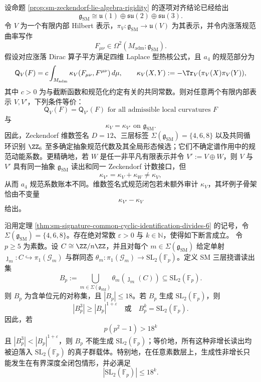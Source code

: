 \begin{proposition}[SM 签名的谱作用二次型缺口]\label{distill:connes_spectral_triples_and_chamseddine_connes_spectral_action-spectral_action_closure_family-gaugeq}
设命题 \ref{prop:sm-zeckendorf-lie-algebra-rigidity} 的逐项对齐结论已经给出
\[
\mathfrak g_{\mathrm{SM}}\cong\mathfrak u(1)\oplus\mathfrak{su}(2)\oplus\mathfrak{su}(3).
\]
令 \(V\) 为一个有限内部 Hilbert 表示，\(\pi_V:\mathfrak g_{\mathrm{SM}}\to\mathfrak u(V)\) 为其表示，并令内涨落规范曲率写作
\[
F_{\mu\nu}\in\Omega^2(M_{\mathrm{adm}};\mathfrak g_{\mathrm{SM}}).
\]
假设对应涨落 Dirac 算子平方满足四维 Laplace 型热核公式，且 \(a_4\) 的规范部分为
\[
\mathsf Q_V(F)=c\int_{M_{\mathrm{adm}}}\kappa_V(F_{\mu\nu},F^{\mu\nu})\,d\mu,
\qquad
\kappa_V(X,Y):=-\Tr_V(\pi_V(X)\pi_V(Y)),
\]
其中 \(c>0\) 为与截断函数和规范化约定有关的共同常数。则对任意两个有限内部表示 \(V,V'\)，下列条件等价：
\[
\mathsf Q_V(F)=\mathsf Q_{V'}(F)\text{ for all admissible local curvatures }F
\]
与
\[
\kappa_V=\kappa_{V'}\text{ on }\mathfrak g_{\mathrm{SM}}.
\]
因此，Zeckendorf 维数签名 \(D=12\)、三层标签 \(\Sigma(\mathfrak g_{\mathrm{SM}})=\{4,6,8\}\) 以及共同循环识别 \(\ZZ_6\) 至多确定抽象规范代数及其全局形态候选；它们不确定谱作用中的规范动能系数。更精确地，若 \(W\) 是任一非平凡有限表示并令 \(V':=V\oplus W\)，则 \(V\) 与 \(V'\) 具有同一抽象 \(\mathfrak g_{\mathrm{SM}}\) 读出和同一 Zeckendorf 计数接口，但
\[
\kappa_{V'}=\kappa_V+\kappa_W\ne\kappa_V,
\]
从而 \(a_4\) 规范系数账本不同。维数签名式规范闭包若未额外审计 \(\kappa_V\)，其坏例子骨架恰由不变量
\[
\kappa_{V'}-\kappa_V
\]
给出。
\end{proposition}
\begin{proposition}\label{distill:breuillard_green_tao_approximate_groups_and_helfgott_growth-product_growth_dichotomy-sm_torsion_sl2_budget_gate}
沿用定理 \ref{thm:sm-signature-common-cyclic-identification-divides-6} 的记号，令
\(\Sigma(\mathfrak g_{\mathrm{SM}})=\{4,6,8\}\)。存在绝对常数 \(\varepsilon>0\) 与 \(k\in\mathbb N\)，使得如下断言成立。
令 \(p\ge 5\) 为素数。设 \(C\cong\ZZ/n\ZZ\)，并且对每个 \(m\in\Sigma(\mathfrak g_{\mathrm{SM}})\) 给定单射
\(\jmath_m:C\hookrightarrow \pi_1(\mathcal G_m)\) 与群同态
\(\theta_m:\pi_1(\mathcal G_m)\to \mathrm{SL}_2(\mathbb F_p)\)。定义 SM 三层挠谱读出集
\[
B_p:=\bigcup_{m\in\Sigma(\mathfrak g_{\mathrm{SM}})}\theta_m(\jmath_m(C))
\subseteq \mathrm{SL}_2(\mathbb F_p).
\]
则 \(B_p\) 为含单位元的对称集，且 \(|B_p|\le 18\)。若 \(B_p\) 生成 \(\mathrm{SL}_2(\mathbb F_p)\)，则
\[
|B_p^3|\ge |B_p|^{1+\varepsilon}
\quad\text{或}\quad
B_p^k=\mathrm{SL}_2(\mathbb F_p).
\]
因此，若
\[
p(p^2-1)>18^k
\]
且 \(|B_p^3|<|B_p|^{1+\varepsilon}\)，则 \(B_p\) 不能生成 \(\mathrm{SL}_2(\mathbb F_p)\)；等价地，所有这种非增长读出均被迫落入 \(\mathrm{SL}_2(\mathbb F_p)\) 的真子群载体。特别地，在任意素数层上，生成性非增长只能发生在有界深度全闭包情形，并必满足
\[
|\mathrm{SL}_2(\mathbb F_p)|\le 18^k.
\]
\end{proposition}
